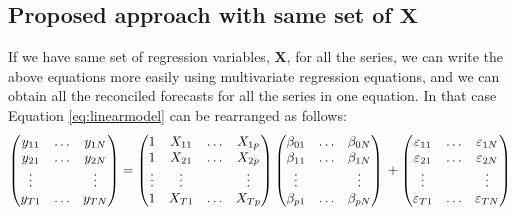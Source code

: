 \documentclass[11pt,a4paper,]{article}
\begin{document}
\hypertarget{proposed-approach-with-same-set-of-bmx}{%
\subsection{\texorpdfstring{Proposed approach with same set of \(\bm{X}\)}{Proposed approach with same set of \textbackslash{}bm\{X\}}}\label{proposed-approach-with-same-set-of-bmx}}

If we have same set of regression variables, \(\bm{X}\), for all the series, we can write the above equations more easily using multivariate regression equations, and we can obtain all the reconciled forecasts for all the series in one equation. In that case Equation \eqref{eq:linearmodel} can be rearranged as follows:
\begin{equation}\label{eq:linearmodelsameX}
  \begin{pmatrix}
  y_{11} & \dots & y_{1N}\\
  y_{21} & \dots & y_{2N}\\
  \vdots &       & \vdots\\
  y_{T1} & \dots & y_{TN}
  \end{pmatrix} =
  \begin{pmatrix}
  1      & X_{11} & \dots & X_{1p}\\
  1      & X_{21} & \dots & X_{2p}\\
  \vdots & \vdots &       & \vdots\\
  1      & X_{T1} & \dots & X_{Tp}
  \end{pmatrix}
  \begin{pmatrix}
  \beta_{01} & \dots & \beta_{0N}\\
  \beta_{11} & \dots & \beta_{1N}\\
  \vdots     &       & \vdots\\
  \beta_{p1} & \dots & \beta_{pN}
  \end{pmatrix} \\
  +
  \begin{pmatrix}
  \varepsilon_{11} & \dots & \varepsilon_{1N}\\
  \varepsilon_{21} & \dots & \varepsilon_{2N}\\
  \vdots           &       & \vdots\\
  \varepsilon_{T1} & \dots & \varepsilon_{TN}
  \end{pmatrix}
\end{equation}
\end{document}
